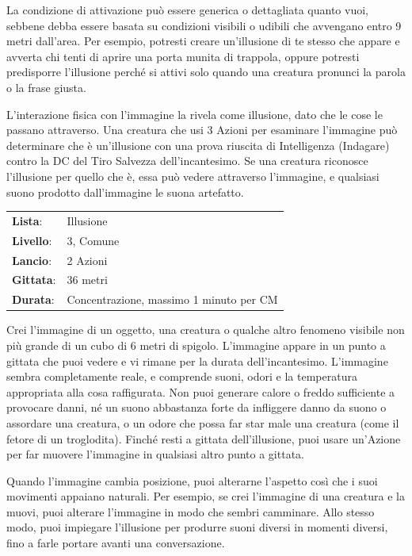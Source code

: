 \begin{multicols}{2}
La condizione di attivazione può essere generica o dettagliata quanto vuoi, sebbene debba essere basata su condizioni visibili o udibili che avvengano entro 9 metri dall'area. Per esempio, potresti creare un'illusione di te stesso che appare e avverta chi tenti di aprire una porta munita di trappola, oppure potresti predisporre l'illusione perché si attivi solo quando una creatura pronunci la parola o la frase giusta.

L'interazione fisica con l'immagine la rivela come illusione, dato che le cose le passano attraverso. Una creatura che usi 3 Azioni per esaminare l'immagine può determinare che è un'illusione con una prova riuscita di Intelligenza (Indagare) contro la DC del Tiro Salvezza dell'incantesimo. Se una creatura riconosce l'illusione per quello che è, essa può vedere attraverso l'immagine, e qualsiasi suono prodotto dall'immagine le suona artefatto.

\noindent\begin{tabularx}{\linewidth}{p{1.3cm}X}
	\rowcolor{gray!20}\textbf{Lista}: & Illusione \\
	\textbf{Livello}: & 3, Comune \\
	\rowcolor{gray!20}\textbf{Lancio}: & 2 Azioni \\
	\textbf{Gittata}: & 36 metri \\
	\rowcolor{gray!20}\textbf{Durata}: & Concentrazione, massimo 1 minuto per CM \\
\end{tabularx}\smallskip

Crei l'immagine di un oggetto, una creatura o qualche altro fenomeno visibile non più grande di un cubo di 6 metri di spigolo. L'immagine appare in un punto a gittata che puoi vedere e vi rimane per la durata dell'incantesimo. L'immagine sembra completamente reale, e comprende suoni, odori e la temperatura appropriata alla cosa raffigurata. Non puoi generare calore o freddo sufficiente a provocare danni, né un suono abbastanza forte da infliggere danno da suono o assordare una creatura, o un odore che possa far star male una creatura (come il fetore di un troglodita). Finché resti a gittata dell'illusione, puoi usare un'Azione per far muovere l'immagine in qualsiasi altro punto a gittata.

Quando l'immagine cambia posizione, puoi alterarne l'aspetto così che i suoi movimenti appaiano naturali. Per esempio, se crei l'immagine di una creatura e la muovi, puoi alterare l'immagine in modo che sembri camminare. Allo stesso modo, puoi impiegare l'illusione per produrre suoni diversi in momenti diversi, fino a farle portare avanti una conversazione.


\end{multicols}

